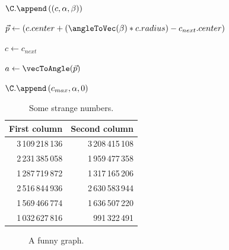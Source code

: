 \begin{algorithm}[bt]
{  $\C.\append \left(
      \left(c , \alpha , \beta \right)
    \right)
  $

  $ \vec{p} \leftarrow \left( c.center + (\angleToVec(\beta) * c.radius ) - c_{next}.center\right)$
  
  $ c \leftarrow c_{next} $
  
  $  a \leftarrow \vecToAngle(\vec{p}) $

  }

  $\C.\append \left( c_{max}, \alpha, 0 \right)$


\end{algorithm}

\begin{table} [bt]
\centering
\caption{Some strange numbers.}
\begin{tabular}{rr}
\toprule
First column & Second column \\
\midrule
3\,109\,218\,136 & 3\,208\,415\,108 \\
2\,231\,385\,058 & 1\,959\,477\,358 \\
1\,287\,719\,872 & 1\,317\,165\,206 \\
2\,516\,844\,936 & 2\,630\,583\,944 \\
1\,569\,466\,774 & 1\,636\,507\,220 \\
1\,032\,627\,816 &    991\,322\,491 \\
\bottomrule
\end{tabular}
\label{tbl:randomnumbers}
\end{table}

\begin{figure} [bt]
  \centering
  \caption{A funny graph.}
  \label{fig:somegraph}
\end{figure}


